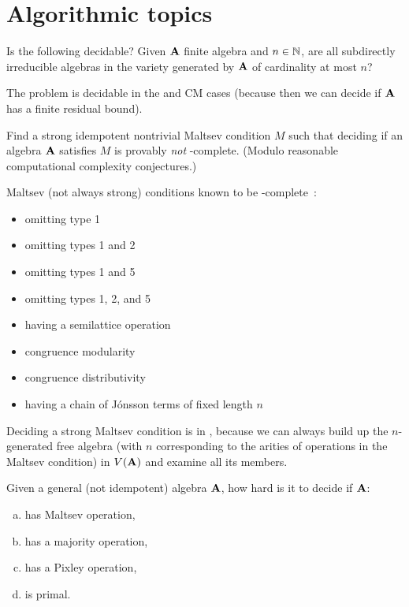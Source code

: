 \section{Algorithmic topics}
\begin{question}
  Is the following decidable? Given ${\mathbf{A}}$ finite algebra and $n\in \mathbb{N}$, are
all subdirectly irreducible algebras in the variety generated by ${\mathbf{A}}$ of
cardinality at most $n$?
\end{question}
\begin{context}
  The problem is decidable in the \SDmeet{} and CM cases (because then we can
decide if ${\mathbf{A}}$ has a finite residual bound).
\end{context}
\begin{question}
  Find a strong idempotent nontrivial Maltsev condition $M$ such that deciding
  if an algebra ${\mathbf{A}}$ satisfies $M$ is provably \emph{not}
  \compEXPTIME-complete. (Modulo reasonable computational complexity conjectures.)
\end{question}
\begin{context}
  Maltsev (not always strong) conditions known to be \compEXPTIME-complete~\cite{freese-valeriote-complexity}:
  \begin{itemize}
    \item omitting type 1
    \item omitting types 1 and 2
    \item omitting types 1 and 5
    \item omitting types 1, 2, and 5
    \item having a semilattice operation
    \item congruence modularity
    \item congruence distributivity
    \item having a chain of Jónsson terms of fixed length $n$
  \end{itemize}

  Deciding a strong Maltsev condition is in \compEXPTIME, because we can always
  build up the $n$-generated free algebra (with $n$ corresponding to the
  arities of operations in the Maltsev condition) in $V({\mathbf{A}})$ and examine all its members.
\end{context}
\begin{question}
  Given a general (not idempotent) algebra ${\mathbf{A}}$, how hard is it to decide if
  ${\mathbf{A}}$:
  \begin{enumerate}[a)]
    \item has Maltsev operation,
    \item has a majority operation,
    \item has a Pixley operation,
    \item is primal.
  \end{enumerate}
\end{question}
